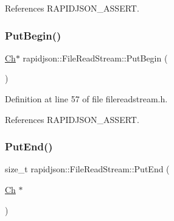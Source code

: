 References R\+A\+P\+I\+D\+J\+S\+O\+N\+\_\+\+A\+S\+S\+E\+RT.

\mbox{\label{classrapidjson_1_1_file_read_stream_a5230a74fccebd3bc41f5e455e3cf7777}} 
\subsubsection{\texorpdfstring{PutBegin()}{PutBegin()}}
{\footnotesize\ttfamily \mbox{\hyperlink{classrapidjson_1_1_file_read_stream_a4a5f34875b40d22def206c9a09ecd929}{Ch}}$\ast$ rapidjson\+::\+File\+Read\+Stream\+::\+Put\+Begin (\begin{DoxyParamCaption}{ }\end{DoxyParamCaption})}



Definition at line 57 of file filereadstream.\+h.


\begin{DoxyCode}{0}

\end{DoxyCode}


References R\+A\+P\+I\+D\+J\+S\+O\+N\+\_\+\+A\+S\+S\+E\+RT.

\mbox{\label{classrapidjson_1_1_file_read_stream_a3160ea8b9906840ef690a07784b97acf}} 
\subsubsection{\texorpdfstring{PutEnd()}{PutEnd()}}
{\footnotesize\ttfamily size\+\_\+t rapidjson\+::\+File\+Read\+Stream\+::\+Put\+End (\begin{DoxyParamCaption}\item[{\mbox{\hyperlink{classrapidjson_1_1_file_read_stream_a4a5f34875b40d22def206c9a09ecd929}{Ch}} $\ast$}]{ }\end{DoxyParamCaption})}




